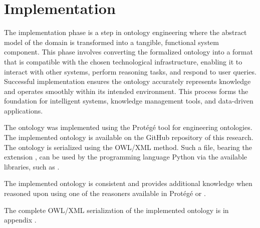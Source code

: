 \chapter{Implementation}\label{ch: Implementation}

The implementation phase is a step in ontology engineering where the abstract model of the domain is transformed into a tangible, functional system component. This phase involves converting the formalized ontology into a format that is compatible with the chosen technological infrastructure, enabling it to interact with other systems, perform reasoning tasks, and respond to user queries. Successful implementation ensures the ontology accurately represents knowledge and operates smoothly within its intended environment. This process forms the foundation for intelligent systems, knowledge management tools, and data-driven applications.

The \magoontologyname ontology was implemented using the Prot\'{e}g\'{e} tool for engineering ontologies. 
The implemented ontology is available on the GitHub repository of this research.
%
The ontology is serialized using the OWL/XML method. Such a file, bearing the extension , can be used by the programming language Python via the available libraries, such as .

The implemented ontology is consistent and provides additional knowledge when reasoned upon using one of the reasoners available in Prot\'{e}g\'{e} or .

The complete OWL/XML serialization of the implemented \magoontologyname ontology is in appendix .
